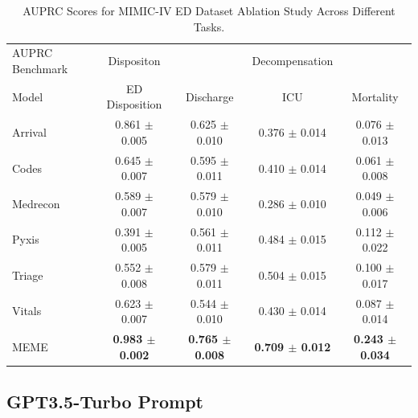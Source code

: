 \documentclass{article}
\theoremstyle{plain}
\theoremstyle{definition}
\theoremstyle{remark}
\begin{document}
\begin{table}[H]
\centering
\caption{AUPRC Scores for MIMIC-IV ED Dataset Ablation Study Across Different Tasks.}
\label{r6}
\begin{adjustbox}{width=5in}
\begin{small}
\begin{tabular}{l|c|ccc}
\toprule
AUPRC Benchmark & Dispositon & & Decompensation &\\
Model & ED Disposition & Discharge & ICU & Mortality \\
\midrule
Arrival & 0.861 $\pm$ 0.005 & 0.625 $\pm$ 0.010 & 0.376 $\pm$ 0.014 & 0.076 $\pm$ 0.013 \\
Codes & 0.645 $\pm$ 0.007 & 0.595 $\pm$ 0.011 & 0.410 $\pm$ 0.014 & 0.061 $\pm$ 0.008 \\
Medrecon & 0.589 $\pm$ 0.007 & 0.579 $\pm$ 0.010 & 0.286 $\pm$ 0.010 & 0.049 $\pm$ 0.006 \\
Pyxis & 0.391 $\pm$ 0.005 & 0.561 $\pm$ 0.011 & 0.484 $\pm$ 0.015 & 0.112 $\pm$ 0.022 \\
Triage & 0.552 $\pm$ 0.008 & 0.579 $\pm$ 0.011 & 0.504 $\pm$ 0.015 & 0.100 $\pm$ 0.017 \\
Vitals & 0.623 $\pm$ 0.007 & 0.544 $\pm$ 0.010 & 0.430 $\pm$ 0.014 & 0.087 $\pm$ 0.014 \\
MEME & \textbf{0.983 $\pm$ 0.002} & \textbf{0.765 $\pm$ 0.008} & \textbf{0.709 $\pm$ 0.012} & \textbf{0.243 $\pm$ 0.034} \\

\bottomrule
\end{tabular}
\end{small}
\end{adjustbox}
\end{table}
\newpage
\subsection{GPT3.5-Turbo Prompt}
\label{gptee}
\end{document}
